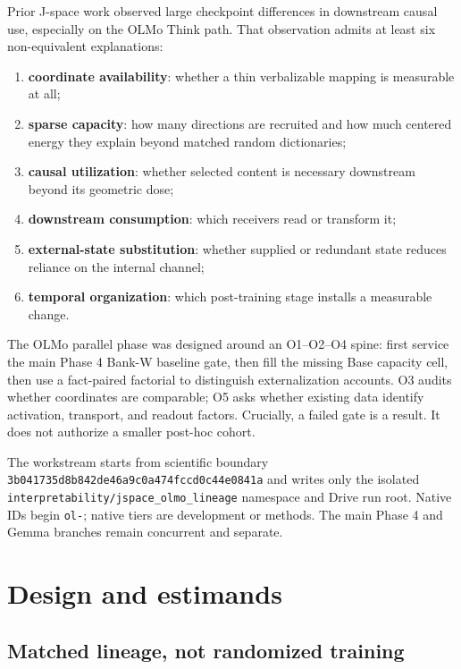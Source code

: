 \documentclass[11pt]{article}
\begin{document}
Prior J-space work observed large checkpoint differences in downstream causal
use, especially on the OLMo Think path. That observation admits at least six
non-equivalent explanations:

\begin{enumerate}
  \item \textbf{coordinate availability}: whether a thin verbalizable mapping
    is measurable at all;
  \item \textbf{sparse capacity}: how many directions are recruited and how
    much centered energy they explain beyond matched random dictionaries;
  \item \textbf{causal utilization}: whether selected content is necessary
    downstream beyond its geometric dose;
  \item \textbf{downstream consumption}: which receivers read or transform it;
  \item \textbf{external-state substitution}: whether supplied or redundant
    state reduces reliance on the internal channel;
  \item \textbf{temporal organization}: which post-training stage installs a
    measurable change.
\end{enumerate}

The OLMo parallel phase was designed around an O1--O2--O4 spine: first service
the main Phase 4 Bank-W baseline gate, then fill the missing Base capacity
cell, then use a fact-paired factorial to distinguish externalization accounts.
O3 audits whether coordinates are comparable; O5 asks whether existing data
identify activation, transport, and readout factors. Crucially, a failed gate
is a result. It does not authorize a smaller post-hoc cohort.

\begin{statusbox}
The workstream starts from scientific boundary
\texttt{3b041735d8b842de46a9c0a474fccd0c44e0841a} and writes only the isolated
\nolinkurl{interpretability/jspace_olmo_lineage} namespace and Drive run root.
Native IDs begin \texttt{ol-}; native tiers are development or methods. The
main Phase 4 and Gemma branches remain concurrent and separate.
\end{statusbox}

\section{Design and estimands}

\subsection{Matched lineage, not randomized training}
\end{document}
